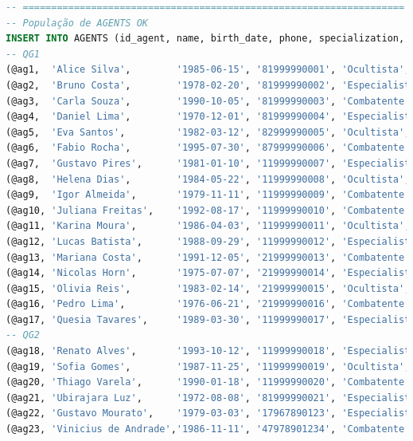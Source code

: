 \documentclass[12pt,a4paper]{report}
\begin{document}
\begin{lstlisting}[language=SQL, caption=population.sql]
-- ===================================================================
-- População de AGENTS OK
INSERT INTO AGENTS (id_agent, name, birth_date, phone, specialization, rank_agent, nex, retired, transcended) VALUES
-- QG1
(@ag1,  'Alice Silva',        '1985-06-15', '81999990001', 'Ocultista',   'Recruta',  20, FALSE, FALSE),
(@ag2,  'Bruno Costa',        '1978-02-20', '81999990002', 'Especialista','Veterano', 45, FALSE, FALSE), -- VER 1 
(@ag3,  'Carla Souza',        '1990-10-05', '81999990003', 'Combatente',  'Elite',    85, FALSE, TRUE),
(@ag4,  'Daniel Lima',        '1970-12-01', '81999990004', 'Especialista','Veterano', 60, FALSE, FALSE),
(@ag5,  'Eva Santos',         '1982-03-12', '82999990005', 'Ocultista',   'Elite',    95, FALSE, TRUE),
(@ag6,  'Fabio Rocha',        '1995-07-30', '87999990006', 'Combatente',  'Recruta',  10, FALSE, FALSE),
(@ag7,  'Gustavo Pires',      '1981-01-10', '11999990007', 'Especialista','Recruta',  25, FALSE, FALSE),
(@ag8,  'Helena Dias',        '1984-05-22', '11999990008', 'Ocultista',   'Veterano', 50, TRUE,  FALSE),
(@ag9,  'Igor Almeida',       '1979-11-11', '11999990009', 'Combatente',  'Elite',    90, FALSE, FALSE),
(@ag10, 'Juliana Freitas',    '1992-08-17', '11999990010', 'Combatente',  'Recruta',  15, FALSE, FALSE),
(@ag11, 'Karina Moura',       '1986-04-03', '11999990011', 'Ocultista',   'Veterano', 55, FALSE, FALSE),
(@ag12, 'Lucas Batista',      '1988-09-29', '11999990012', 'Especialista','Elite',    80, FALSE, FALSE),
(@ag13, 'Mariana Costa',      '1991-12-05', '21999990013', 'Combatente',  'Veterano', 65, FALSE, FALSE),
(@ag14, 'Nicolas Horn',       '1975-07-07', '21999990014', 'Especialista','Recruta',  18, FALSE, FALSE),
(@ag15, 'Olivia Reis',        '1983-02-14', '21999990015', 'Ocultista',   'Elite',    88, FALSE, TRUE),
(@ag16, 'Pedro Lima',         '1976-06-21', '21999990016', 'Combatente',  'Veterano', 58, FALSE, FALSE),
(@ag17, 'Quesia Tavares',     '1989-03-30', '11999990017', 'Especialista','Recruta',  22, FALSE, FALSE),
-- QG2
(@ag18, 'Renato Alves',       '1993-10-12', '11999990018', 'Especialista','Veterano', 47, FALSE, FALSE),
(@ag19, 'Sofia Gomes',        '1987-11-25', '11999990019', 'Ocultista',   'Elite',    92, FALSE, TRUE),
(@ag20, 'Thiago Varela',      '1990-01-18', '11999990020', 'Combatente',  'Recruta',  12, FALSE, FALSE),
(@ag21, 'Ubirajara Luz',      '1972-08-08', '81999990021', 'Especialista','Veterano', 60, FALSE, FALSE),
(@ag22, 'Gustavo Mourato',    '1979-03-03', '17967890123', 'Especialista','Veterano', 62, FALSE, FALSE),
(@ag23, 'Vinicius de Andrade','1986-11-11', '47978901234', 'Combatente',  'Elite',    96, TRUE,  FALSE),

\end{lstlisting}
\end{document}
